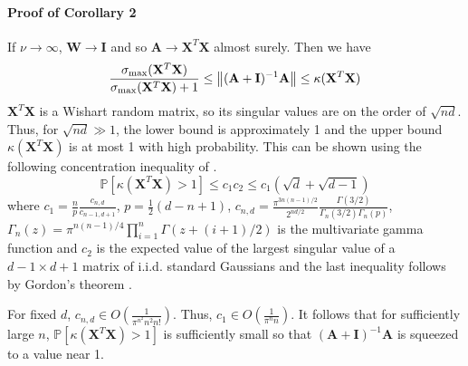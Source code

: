 \documentclass[mnsc,blindrev]{informs3}
\begin{document}
    
        \paragraph{Proof of Corollary 2}
            If $\nu \rightarrow \infty$, $\mathbf{W} \rightarrow \mathbf{I}$ and so $\mathbf{A} \rightarrow \mathbf{X}^T \mathbf{X}$ almost surely. Then we have 
            \begin{equation*}
                \frac{\sigma_{\max}(\mathbf{X}^T \mathbf{X})}{\sigma_{\max}(\mathbf{X}^T \mathbf{X})+1} \leq \norm{(\mathbf{A} + \mathbf{I})^{-1}\mathbf{A}} \leq  \kappa(\mathbf{X}^T \mathbf{X})%
            \end{equation*}
            $\mathbf{X}^T \mathbf{X}$ is a Wishart random matrix, so its singular values are on the order of $\sqrt{nd}$. Thus, for $\sqrt{nd} \gg 1$, the lower bound is approximately 1 and the upper bound $\kappa(\mathbf{X}^T \mathbf{X})$ is at most 1 with high probability.  
            This can be shown using the following concentration inequality of \citep{edelman2005tails}.
            \begin{equation*}
                \mathds{P}[\kappa(\mathbf{X}^T \mathbf{X}) > 1] \leq c_1 c_2 \leq c_1 (\sqrt{d} + \sqrt{d-1})%
            \end{equation*}
            where $c_1 = \frac{n}{p} \frac{c_{n,d}}{c_{n-1,d+1}}$, $p=\frac{1}{2}(d-n+1)$, $c_{n,d} = \frac{\pi^{3n(n-1)/2}}{2^{nd/2}} \frac{\Gamma(3/2)}{\Gamma_n(3/2)\Gamma_n(p)}$, $\Gamma_n(z) = \pi^{n(n-1)/4} \prod_{i=1}^n \Gamma(z + (i+1)/2)$ is the multivariate gamma function and $c_2$ is the expected value of the largest singular value of a $d-1\times d+1$ matrix of i.i.d. standard Gaussians and the last inequality follows by Gordon's theorem \citep{vershynin2012introduction}.
    
            For fixed $d$, $c_{n,d} \in O\left(\frac{1}{\pi^{n^2} n^2 n!}\right)$. Thus, $c_1 \in O\left(\frac{1}{\pi^{n}n}\right)$. It follows that for sufficiently large $n$, $\mathds{P}[\kappa(\mathbf{X}^T \mathbf{X}) > 1]$ is sufficiently small so that $(\mathbf{A} + \mathbf{I})^{-1}\mathbf{A}$ is squeezed to a value near 1. %
    
\end{document}
